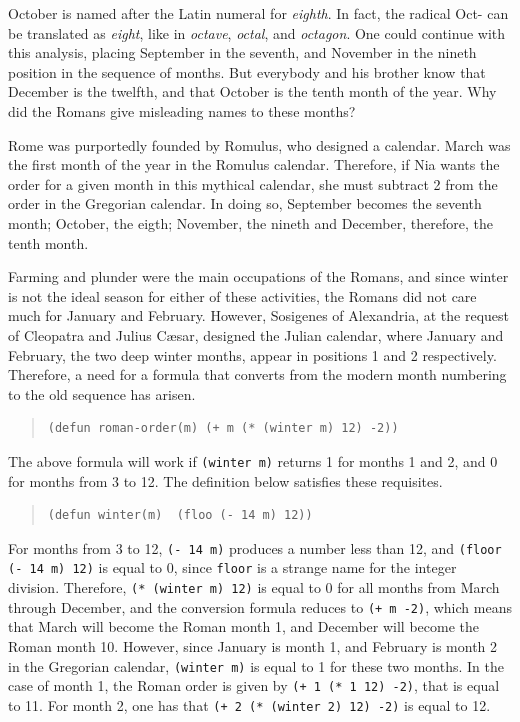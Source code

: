 \documentclass[a4paper,12pt]{book}
\begin{document}
October is named after the Latin numeral for {\em eighth}.
In fact, the radical {\sc Oct-} can be translated
as {\em eight}, like in
{\em octave}, {\em octal}, and {\em octagon}.
One could continue with this analysis,
placing September in the seventh,
and November in the nineth position
in the sequence of months.
But everybody and
his brother know that December is the
twelfth, and that
October is the tenth month of the
year. Why did the Romans give misleading
names to these months?

Rome was purportedly founded by Romulus,
who designed a calendar.
March was the first month of the year
in the Romulus calendar. Therefore, if Nia
wants the order for a given month in
this mythical calendar, she must
subtract 2 from the order
in the Gregorian calendar.
In doing so, September becomes the
seventh month; October, the eigth;
November, the nineth and
December, therefore, the tenth month.

Farming and plunder were the main
occupations of the Romans, and since winter
is not the ideal season for
either of these activities,
the Romans did not care much for
January and February. However,
Sosigenes of Alexandria,
at the request of Cleopatra and
Julius C\ae sar, designed the
Julian calendar, where January
and February, the two deep winter
months, appear in  positions
1 and 2 respectively.
Therefore, a need for a formula
that converts from the modern
month numbering to the
old sequence has arisen.
\begin{quote}
\begin{verbatim}
(defun roman-order(m) (+ m (* (winter m) 12) -2))
\end{verbatim}
\end{quote}
The above formula will work if \verb|(winter m)|
returns 1 for months 1 and 2, and
0 for months from 3 to 12. The definition
below satisfies these requisites.
\begin{quote}
\begin{verbatim}
(defun winter(m)  (floo (- 14 m) 12))
\end{verbatim}
\end{quote}
For months from 3 to 12,
\verb|(- 14 m)| produces a number
less than 12, and \verb|(floor (- 14 m) 12)|
is equal to 0, since \verb|floor| is a strange
name for the integer division. Therefore,
\verb|(* (winter m) 12)| is equal to
0 for all months from March through December,
and the conversion formula reduces
to \verb|(+ m -2)|, which means that
March will become the Roman month 1, and December
will become the Roman month 10.
However, since January is month 1,
and February is month 2 in the Gregorian
calendar, \verb|(winter m)| is
equal to 1 for these two months.
In the case of month 1,
the Roman order is given by
\verb|(+ 1 (* 1 12) -2)|, that is
equal to 11. For month 2, one has that
\verb|(+ 2 (* (winter 2) 12) -2)|
is equal to 12.
\end{document}
